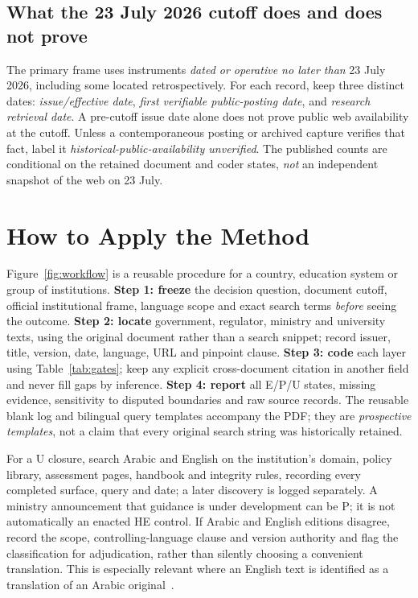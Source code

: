 \documentclass[conference,letterpaper]{IEEEtran}
\begin{document}
\subsection{What the 23 July 2026 cutoff does and does not prove}
The primary frame uses instruments \emph{dated or operative no later than} 23 July 2026, including some located retrospectively. For each record, keep three distinct dates: \emph{issue/effective date}, \emph{first verifiable public-posting date}, and \emph{research retrieval date}. A pre-cutoff issue date alone does not prove public web availability at the cutoff. Unless a contemporaneous posting or archived capture verifies that fact, label it \emph{historical-public-availability unverified}. The published counts are conditional on the retained document and coder states, \emph{not} an independent snapshot of the web on 23 July.

\section{How to Apply the Method}
Figure~\ref{fig:workflow} is a reusable procedure for a country, education system or group of institutions. \textbf{Step 1: freeze} the decision question, document cutoff, official institutional frame, language scope and exact search terms \emph{before} seeing the outcome. \textbf{Step 2: locate} government, regulator, ministry and university texts, using the original document rather than a search snippet; record issuer, title, version, date, language, URL and pinpoint clause. \textbf{Step 3: code} each layer using Table~\ref{tab:gates}; keep any explicit cross-document citation in another field and never fill gaps by inference. \textbf{Step 4: report} all E/P/U states, missing evidence, sensitivity to disputed boundaries and raw source records. The reusable blank log and bilingual query templates accompany the PDF; they are \emph{prospective templates}, not a claim that every original search string was historically retained.

For a U closure, search Arabic and English on the institution's domain, policy library, assessment pages, handbook and integrity rules, recording every completed surface, query and date; a later discovery is logged separately. A ministry announcement that guidance is under development can be P; it is not automatically an enacted HE control. If Arabic and English editions disagree, record the scope, controlling-language clause and version authority and flag the classification for adjudication, rather than silently choosing a convenient translation. This is especially relevant where an English text is identified as a translation of an Arabic original~\cite{qataru}.
\end{document}
